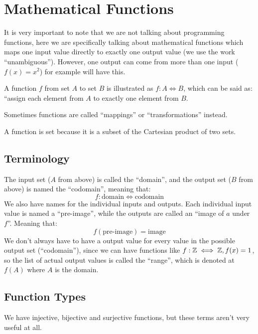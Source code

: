 \section{Mathematical Functions}\label{sec:mathematical_functions}

It is very important to note that we are not talking about programming functions, here we are specifically talking about mathematical functions which maps one input value directly to exactly one output value (we use the work ``unambiguous'').
However, one output can come from more than one input (\(f(x) = x^2\)) for example will have this.

A function \(f\) from set \(A\) to set \(B\) is illustrated as \(f: A \iff B\), which can be said as: ``assign each element from \(A\) to exactly one element from \(B\).
\begin{note}
    Sometimes functions are called ``mappings'' or ``transformations'' instead.
\end{note}
\begin{note}
    A function is set because it is a subset of the Cartesian product of two sets.
\end{note}

\subsection{Terminology}\label{sub:mathsetterminology}

The input set (\(A\) from above) is called the ``domain'', and the output set (\(B\) from above) is named the ``codomain'', meaning that:
\[
    f: \text{domain} \iff \text{codomain}
\]
We also have names for the individual inputs and outputs. Each individual input value is named a ``pre-image'', while the outputs are called an ``image of \(a\) under \(f\)''.
Meaning that:
\[
    f(\text{pre-image}) = \text{image}
\]
We don't always have to have a output value for every value in the possible output set (``codomain''), since we can have functions like \(f: \mathbb{Z} \iff \mathbb{Z}, f(x) = 1\), so the list of actual output values is called the ``range'', which is denoted at \(f(A)\) where \(A\) is the domain.

\subsection{Function Types}\label{sub:function_types}

We have injective, bijective and surjective functions, but these terms aren't very useful at all.

